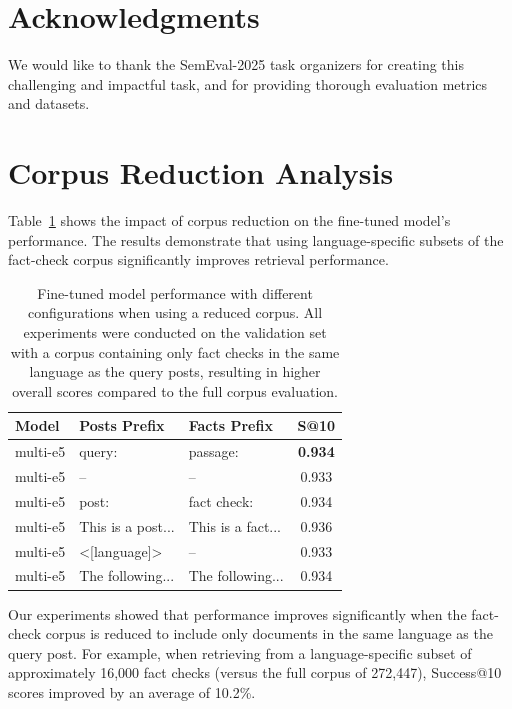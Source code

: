 \documentclass[11pt]{article}
\begin{document}
\section{Acknowledgments}

We would like to thank the SemEval-2025 task organizers for creating this challenging and impactful task, and for providing thorough evaluation metrics and datasets.

%


\appendix

\section{Corpus Reduction Analysis}
\label{sec:appendix-results}

Table~\ref{tab:prefix-experiments} shows the impact of corpus reduction on the fine-tuned model's performance. The results demonstrate that using language-specific subsets of the fact-check corpus significantly improves retrieval performance.

\begin{table}[h]
  \centering
  \small
  \begin{tabular}{p{1.6cm}p{1.8cm}p{1.8cm}c}
    \hline
    \textbf{Model} & \textbf{Posts Prefix} & \textbf{Facts Prefix} & \textbf{S@10} \\
    \hline
    multi-e5 & query: & passage: & \textbf{0.934} \\
    multi-e5 & -- & -- & 0.933 \\
    multi-e5 & post: & fact check: & 0.934 \\
    multi-e5 & This is a post... & This is a fact... & 0.936 \\
    multi-e5 & <[language]> & -- & 0.933 \\
    multi-e5 & The following... & The following... & 0.934 \\
    \hline
  \end{tabular}
  \caption{Fine-tuned model performance with different configurations when using a reduced corpus. All experiments were conducted on the validation set with a corpus containing only fact checks in the same language as the query posts, resulting in higher overall scores compared to the full corpus evaluation.}
  \label{tab:prefix-experiments}
\end{table}

Our experiments showed that performance improves significantly when the fact-check corpus is reduced to include only documents in the same language as the query post. For example, when retrieving from a language-specific subset of approximately 16,000 fact checks (versus the full corpus of 272,447), Success@10 scores improved by an average of 10.2\%.
\end{document}
